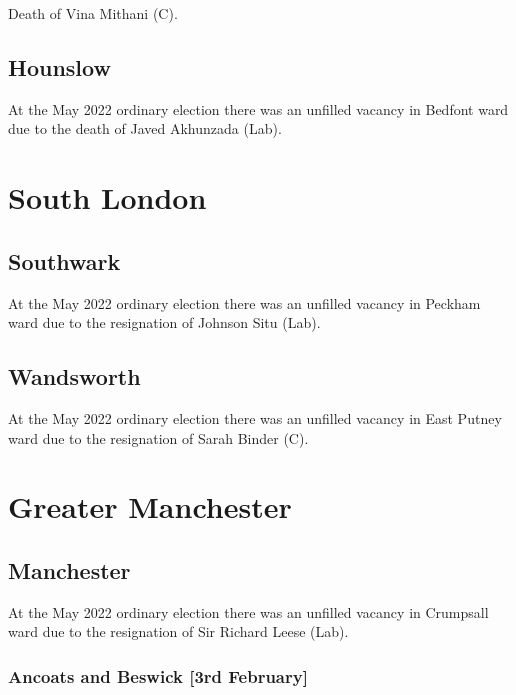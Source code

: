 \documentclass[a4paper,openany]{book}
\begin{document}
\begin{resultsiii}

Death of Vina Mithani (C).

\subsection*{Hounslow}

At the May 2022 ordinary election there was an unfilled vacancy in Bedfont ward due to the death of Javed Akhunzada (Lab).%

\section{South London}

\subsection*{Southwark}

At the May 2022 ordinary election there was an unfilled vacancy in Peckham ward due to the resignation of Johnson Situ (Lab).%

\subsection*{Wandsworth}

At the May 2022 ordinary election there was an unfilled vacancy in East Putney ward due to the resignation of Sarah Binder (C).%

\section{Greater Manchester}

\subsection*{Manchester}

At the May 2022 ordinary election there was an unfilled vacancy in Crumpsall ward due to the resignation of Sir Richard Leese (Lab).%

\subsubsection*{Ancoats and Beswick \hspace*{\fill}\nolinebreak[1]%
	\enspace\hspace*{\fill}
	[3rd February]}


\end{resultsiii}
\end{document}
